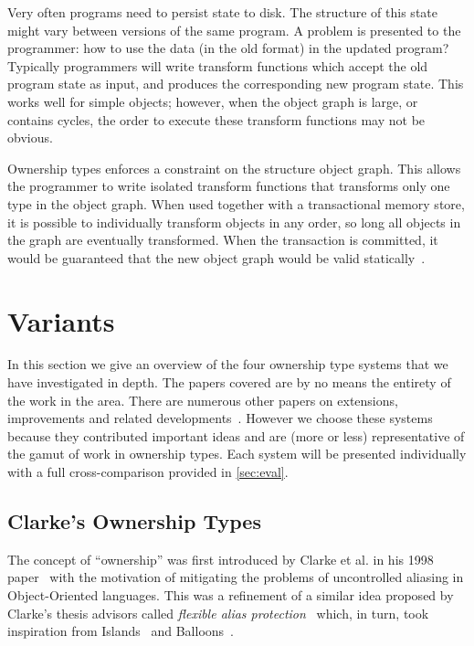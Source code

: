\documentclass{acm_proc_article-sp}
\begin{document}
Very often programs need to persist state to disk. The structure of this state
might vary between versions of the same program. A problem is presented to the
programmer: how to use the data (in the old format) in the updated program?
Typically programmers will write transform functions which accept the old
program state as input, and produces the corresponding new program state. This
works well for simple objects; however, when the object graph is large, or
contains cycles, the order to execute these transform functions may not be
obvious.

Ownership types enforces a constraint on the structure object graph. This
allows the programmer to write isolated transform functions that transforms
only one type in the object graph. When used together with a transactional
memory store, it is possible to individually transform objects in any order, so
long all objects in the graph are eventually transformed. When the transaction
is committed, it would be guaranteed that the new object graph would be
valid statically~\cite{boyapati04safejava,boyapati03innerclass}.

\section{Variants}
\label{sec:variants}

In this section we give an overview of the four ownership type systems that we
have investigated in depth. The papers covered are by no means the entirety of
the work in the area. There are numerous other papers on extensions,
improvements and related developments~\cite{clarke13survey}. However we choose
these systems because they contributed important ideas and are (more or less)
representative of the gamut of work in ownership types. Each system will be
presented individually with a full cross-comparison provided in \cref{sec:eval}.

\subsection{Clarke's Ownership Types}
\label{subsec:clarke}

The concept of ``ownership'' was first introduced by Clarke et al. in his 1998
paper~\cite{clarke98ownership} with the motivation of mitigating the problems
of uncontrolled aliasing in Object-Oriented languages. This was a refinement of
a similar idea proposed by Clarke's thesis advisors called \emph{flexible alias
protection}~\cite{noble98alias} which, in turn, took inspiration from
Islands~\cite{hogg91islands} and Balloons~\cite{almeida97balloons}.
\end{document}
